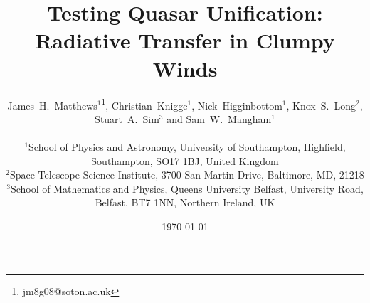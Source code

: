 \documentclass[useAMS,usenatbib]{mn2e_x}
\begin{document}


\def\py{\textsc{Python}}
\def\tar{\textsc{Tardis}}
\def\cld{\textsc{Cloudy}}
\def\agn{\textsc{Agnspec}}


\def\civ{C~\textsc{iv}}
\def\nv{N~\textsc{v}}
\def\hei{He~\textsc{i}}
\def\heii{He~\textsc{ii}}
\def\heiiline{He~\textsc{ii}~$4686$\AA}
\def\mg{Mg~\textsc{ii}}
\def\al{Al~\textsc{iii}}
\def\heii{He~\textsc{ii}}
\def\ovi{O~\textsc{vi}}
\def\la{Ly~$\alpha$}
\def\ha{H~$\alpha$}
\def\hb{H~$\beta$}



\def\araa{ARAA}
\def\nat{Nature}
\def\apjl{ApJ Letters}
\def\aapr{AAPR}
\def\ssr{SSR}
\def\apj{ApJ}
\def\apjs{ApJs}
\def\pasp{PASP}
\def\aap{A\&A}
\def\mnras{MNRAS}
\def\aj{AJ}
\def\rmxaa{RMXAA}
\def\aaps{A\&As}
\def\LA{Lyman\thinspace$\alpha$}

\newcommand{\EXPN}[2]{\mbox{$#1\times 10^{#2}$}}
\newcommand{\EXPU}[3]{\mbox{\rm $#1 \times 10^{#2} \rm\:#3$}}  %
\newcommand{\POW}[2]{\mbox{$\rm10^{#1}\rm\:#2$}}
\def\LUM{\:{\rm erg\:s^{-1}}}
\def\FLUX{\:{\rm erg\:cm^{-2}\:s^{-1}}}
\def\OIGS{\:{\rm erg\:cm^{-2}\:s^{-1}\:\AA^{-1}}}

%
%

\title
[Testing Quasar Unification]{
Testing Quasar Unification: Radiative Transfer in Clumpy Winds
}


\author[Matthews et al.]{
\parbox[t]{\textwidth}{
James~H.~Matthews$^1$\thanks{jm8g08@soton.ac.uk}, Christian~Knigge$^1$,
Nick~Higginbottom$^1$, Knox~S.~Long$^2$, Stuart~A.~Sim$^3$ and Sam~W.~Mangham$^1$
}
\medskip  
\\$^1$School of Physics and Astronomy, University of Southampton, Highfield, Southampton, SO17 1BJ, United Kingdom
\\$^2$Space Telescope Science Institute, 3700 San Martin Drive, Baltimore, MD, 21218
\\$^3$School of Mathematics and Physics, Queens University Belfast, University Road, Belfast, BT7 1NN, Northern Ireland, UK
}





\date{\today}
\end{document}
